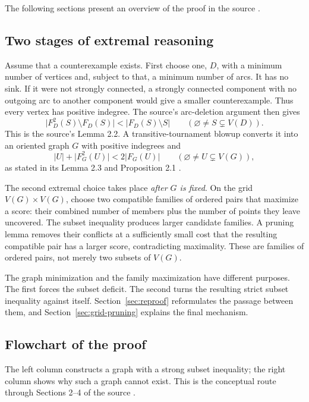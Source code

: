 \documentclass[11pt]{article}
\newcommand{\abs}[1]{\lvert#1\rvert}
\begin{document}
The following sections present an overview of the proof in the source \cite{openai}.
\subsection{Two stages of extremal reasoning}
\label{sec:reduction-overview}
Assume that a counterexample exists. First choose one, $D$, with a
minimum number of vertices and, subject to that, a minimum number of
arcs. It has no sink. If it were not strongly connected, a strongly
connected component with no outgoing arc to another component would
give a smaller counterexample. Thus every vertex has positive
indegree. The source's arc-deletion argument then gives
\begin{equation}
 \abs{F_D^2(S)\setminus F_D(S)}<\abs{F_D(S)\setminus S}
       \qquad(\varnothing\ne S\subsetneq V(D)).
 \label{eq:subset-deficit}
\end{equation}
This is the source's Lemma 2.2. A transitive-tournament blowup converts
it into an oriented graph $G$ with positive indegrees and
\begin{equation}
 \abs U+\abs{F_G^2(U)}<2\abs{F_G(U)}
       \qquad(\varnothing\ne U\subsetneq V(G)),
 \label{eq:strict-concavity}
\end{equation}
as stated in its Lemma 2.3 and Proposition 2.1 \cite{openai}.

The second extremal choice takes place \emph{after $G$ is fixed}.
On the grid $V(G)\times V(G)$, choose two compatible families of
ordered pairs that maximize a score: their combined number of members
plus the number of points they leave uncovered. The subset inequality
produces larger candidate families. A pruning lemma removes their
conflicts at a sufficiently small cost that the resulting compatible
pair has a larger score, contradicting maximality. These are families
of ordered pairs, not merely two subsets of $V(G)$.

The graph minimization and the family maximization have different
purposes. The first forces the subset deficit. The second turns the
resulting strict subset inequality against itself. Section~\ref{sec:reproof}
reformulates the passage between them, and
Section~\ref{sec:grid-pruning} explains the final mechanism.

\subsection{Flowchart of the proof}
\label{sec:flow}

The left column constructs a graph with a strong subset inequality; the
right column shows why such a graph cannot exist. This is the conceptual route
through Sections 2--4 of the source \cite{openai}.
\end{document}
